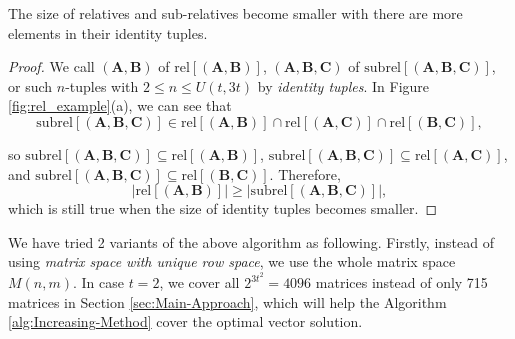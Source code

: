 \begin{thm}
The size of relatives and sub-relatives become smaller with there
are more elements in their identity tuples. \label{theo:size_rel}
\end{thm}
\begin{proof}
We call $\left(\boldsymbol{A},\boldsymbol{B}\right)$ of $\mathrm{rel}\left[\left(\boldsymbol{A},\boldsymbol{B}\right)\right]$,
$\left(\boldsymbol{A},\boldsymbol{B},\boldsymbol{C}\right)$ of $\mathrm{subrel}\left[\left(\boldsymbol{A},\boldsymbol{B},\boldsymbol{C}\right)\right]$,
or such $n$-tuples with $2\leq n\leq U\left(t,3t\right)$ by \textit{identity
tuples}. In Figure \ref{fig:rel_example}(a), we can see that 
\[
\mathrm{subrel}\left[\left(\boldsymbol{A},\boldsymbol{B},\boldsymbol{C}\right)\right]\in\mathrm{rel}\left[\left(\boldsymbol{A},\boldsymbol{B}\right)\right]\cap\mathrm{rel}\left[\left(\boldsymbol{A},\boldsymbol{C}\right)\right]\cap\mathrm{rel}\left[\left(\boldsymbol{B},\boldsymbol{C}\right)\right],
\]

so $\mathrm{subrel}\left[\left(\boldsymbol{A},\boldsymbol{B},\boldsymbol{C}\right)\right]\subseteq\mathrm{rel}\left[\left(\boldsymbol{A},\boldsymbol{B}\right)\right]$,
$\mathrm{subrel}\left[\left(\boldsymbol{A},\boldsymbol{B},\boldsymbol{C}\right)\right]\subseteq\mathrm{rel}\left[\left(\boldsymbol{A},\boldsymbol{C}\right)\right]$,
and $\mathrm{subrel}\left[\left(\boldsymbol{A},\boldsymbol{B},\boldsymbol{C}\right)\right]\subseteq\mathrm{rel}\left[\left(\boldsymbol{B},\boldsymbol{C}\right)\right]$.
Therefore,
\[
\left|\mathrm{rel}\left[\left(\boldsymbol{A},\boldsymbol{B}\right)\right]\right|\geq\left|\mathrm{subrel}\left[\left(\boldsymbol{A},\boldsymbol{B},\boldsymbol{C}\right)\right]\right|,
\]
which is still true when the size of identity tuples becomes smaller.
\end{proof}
We have tried 2 variants of the above algorithm as following. Firstly,
instead of using \textit{matrix space with unique row space}, we use
the whole matrix space $M\left(n,m\right)$. In case $t=2$, we cover
all $2^{3t^{2}}=4096$ matrices instead of only 715 matrices in Section
\ref{sec:Main-Approach}, which will help the Algorithm \ref{alg:Increasing-Method}
cover the optimal vector solution.
